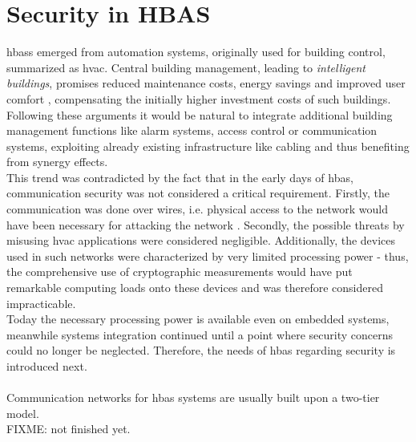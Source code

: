 \section{Security in HBAS}\label{hbaSec}
\glspl{hbas} emerged from automation systems, originally used for building control, summarized as \gls{hvac}.
Central building management, leading to \textit{intelligent buildings}, promises
reduced maintenance costs, energy savings and improved user comfort \cite{1435745}, compensating the initially higher investment costs of such buildings.
Following these arguments it would be natural to integrate additional building management functions like alarm systems, access control or communication systems,
exploiting already existing infrastructure like cabling and thus benefiting from synergy effects.
\\
This trend was contradicted by the fact that in the early days of \gls{hbas}, communication security was not considered a critical requirement.
Firstly, the communication was done over wires,
i.e. physical access to the network would have been necessary for attacking the network \cite{knxSpec}. Secondly, the possible threats by misusing \gls{hvac} applications
were considered negligible. Additionally, the devices used in such networks were characterized by very limited processing power - thus, the comprehensive
use of cryptographic measurements would have put remarkable computing loads onto these devices and was therefore considered impracticable.
\\
Today the necessary processing power is available even on embedded systems, meanwhile systems integration continued until a point where security concerns could
no longer be neglected. Therefore, the needs of \gls{hbas} regarding security is introduced next.
\\
\\
Communication networks for \gls{hbas} systems are usually built upon a two-tier model.
\\
FIXME: not finished yet.
